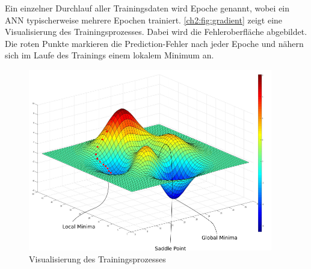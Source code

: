 \bigskip
Ein einzelner Durchlauf aller Trainingsdaten wird Epoche genannt, wobei ein \ac{ANN} typischerweise mehrere Epochen trainiert.
\autoref{ch2:fig:gradient} zeigt eine Visualisierung des Trainingsprozesses.
Dabei wird die Fehleroberfläche abgebildet. Die roten Punkte markieren die Prediction-Fehler nach jeder Epoche und nähern sich im Laufe des Trainings einem lokalem Minimum an.
\begin{figure}[ht]
    \begin{small}
        \begin{center}
            \includegraphics[width=0.95\textwidth]{figures/gradient_descent_problems-dotted}
        \end{center}
        \caption{Visualisierung des Trainingsprozesses \cite{singh_optimization_2019}}
        \label{ch2:fig:gradient}
    \end{small}
\end{figure}


